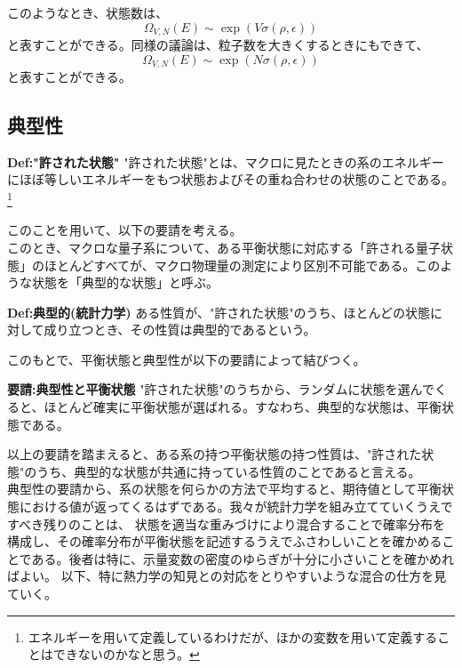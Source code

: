 \documentclass[a4paper,11pt]{jsarticle}
\numberwithin{equation}{section}
\begin{document}
このようなとき、状態数は、
\begin{equation}
  \Omega_{V,N}(E) \sim \exp(V\sigma(\rho, \epsilon))
\end{equation}
と表すことができる。同様の議論は、粒子数を大きくするときにもできて、
\begin{equation}
  \Omega_{V,N}(E) \sim \exp(N\sigma(\rho, \epsilon))
\end{equation}
と表すことができる。

\subsection{典型性}
\begin{itembox}[l]{\textbf{Def:"許された状態"}}
  "許された状態"とは、マクロに見たときの系のエネルギーにほぼ等しいエネルギーをもつ状態およびその重ね合わせの状態のことである。\footnote{エネルギーを用いて定義しているわけだが、ほかの変数を用いて定義することはできないのかなと思う。}
\end{itembox}
このことを用いて、以下の要請を考える。\\

このとき、マクロな量子系について、ある平衡状態に対応する「許される量子状態」のほとんどすべてが、マクロ物理量の測定により区別不可能である。このような状態を「典型的な状態」と呼ぶ。

\begin{itembox}[l]{\textbf{Def:典型的(統計力学)}}
  ある性質が、"許された状態"のうち、ほとんどの状態に対して成り立つとき、その性質は典型的であるという。
\end{itembox}

このもとで、平衡状態と典型性が以下の要請によって結びつく。\\

\begin{itembox}[l]{\textbf{要請:典型性と平衡状態}}
  "許された状態"のうちから、ランダムに状態を選んでくると、ほとんど確実に平衡状態が選ばれる。すなわち、典型的な状態は、平衡状態である。
\end{itembox}
以上の要請を踏まえると、ある系の持つ平衡状態の持つ性質は、"許された状態"のうち、典型的な状態が共通に持っている性質のことであると言える。\\
典型性の要請から、系の状態を何らかの方法で平均すると、期待値として平衡状態における値が返ってくるはずである。我々が統計力学を組み立てていくうえですべき残りのことは、
状態を適当な重みづけにより混合することで確率分布を構成し、その確率分布が平衡状態を記述するうえでふさわしいことを確かめることである。後者は特に、示量変数の密度のゆらぎが十分に小さいことを確かめればよい。
以下、特に熱力学の知見との対応をとりやすいような混合の仕方を見ていく。\\
\end{document}

